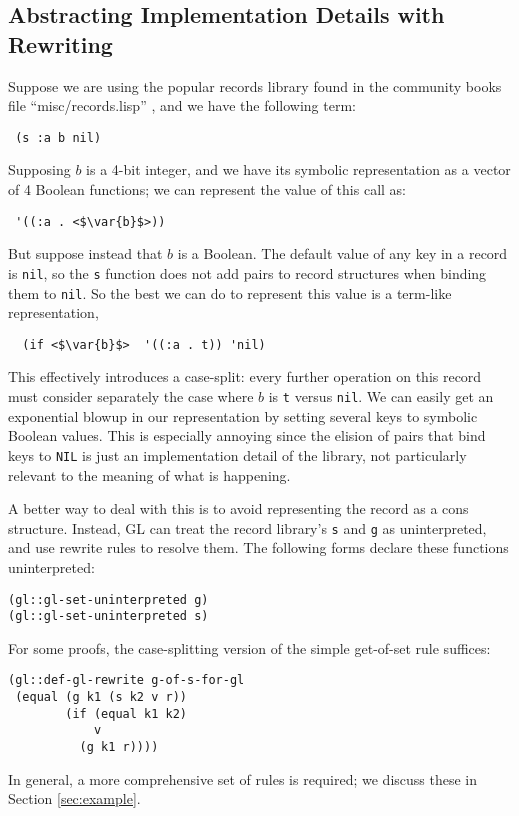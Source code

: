 \documentclass[submission,copyright,creativecommons]{eptcs}
\newcommand*{\var}[1]{\mathit{#1}}
\begin{document}
\subsection{Abstracting Implementation Details with Rewriting}
\label{sec:rewriting}
Suppose we are using the popular records library found in the
community books file ``misc/records.lisp''
\cite{kaufmann2002efficient}, and we have the following term:
\begin{verbatim}
 (s :a b nil)
\end{verbatim}
Supposing $\var{b}$ is a 4-bit integer, and we have its symbolic
representation as a vector of 4 Boolean functions; we can represent
the value of this call as:
\begin{lstlisting}
 '((:a . <$\var{b}$>))
\end{lstlisting}
But suppose instead that $\var{b}$ is a Boolean.  The default value
of any key in a record is \texttt{nil}, so the \texttt{s} function
does not add pairs to record structures when binding them to
\texttt{nil}.  So the best we can do to represent this value is a term-like representation,
\begin{lstlisting}
  (if <$\var{b}$>  '((:a . t)) 'nil)
\end{lstlisting}
This effectively introduces a case-split: every further operation on
this record must consider separately the case where $\var{b}$ is
\texttt{t} versus \texttt{nil}.  We can easily get an exponential
blowup in our representation by setting several keys to symbolic
Boolean values.  This is especially annoying since the elision of
pairs that bind keys to \texttt{NIL} is just an implementation detail
of the library, not particularly relevant to the meaning of what is
happening.

A better way to deal with this is to avoid representing the record as
a cons structure.  Instead, GL can treat the record library's
\texttt{s} and \texttt{g} as uninterpreted, and use rewrite rules to
resolve them.  The following forms declare these functions uninterpreted:
\begin{verbatim}
(gl::gl-set-uninterpreted g)
(gl::gl-set-uninterpreted s)
\end{verbatim}
For some proofs, the case-splitting version of the
simple get-of-set rule suffices:
\begin{verbatim}
(gl::def-gl-rewrite g-of-s-for-gl
 (equal (g k1 (s k2 v r))
        (if (equal k1 k2)
            v
          (g k1 r))))
\end{verbatim}
\noindent In general, a more comprehensive set of rules is required;
we discuss these in Section \ref{sec:example}.
\end{document}
